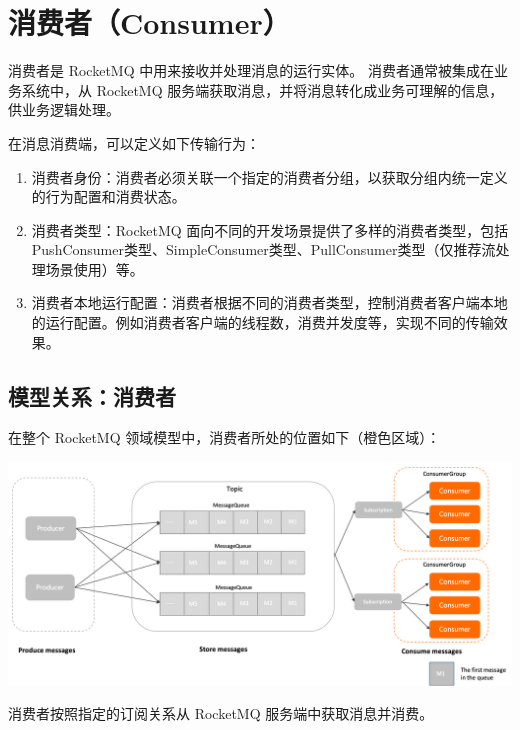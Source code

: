 \documentclass[11pt, a4paper, oneside, fontset=none]{ctexbook}
\begin{document}
\section{消费者（Consumer）}
消费者是 RocketMQ 中用来接收并处理消息的运行实体。
消费者通常被集成在业务系统中，从 RocketMQ 服务端获取消息，并将消息转化成业务可理解的信息，供业务逻辑处理。

在消息消费端，可以定义如下传输行为：
\begin{enumerate}
  \item 消费者身份：消费者必须关联一个指定的消费者分组，以获取分组内统一定义的行为配置和消费状态。
  \item 消费者类型：RocketMQ 面向不同的开发场景提供了多样的消费者类型，包括PushConsumer类型、SimpleConsumer类型、PullConsumer类型（仅推荐流处理场景使用）等。
  \item 消费者本地运行配置：消费者根据不同的消费者类型，控制消费者客户端本地的运行配置。例如消费者客户端的线程数，消费并发度等，实现不同的传输效果。
\end{enumerate}

\subsection{模型关系：消费者}
在整个 RocketMQ 领域模型中，消费者所处的位置如下（橙色区域）：

\begin{center}
  \begin{minipage}{\textwidth}
    \center
    \includegraphics[width=\textwidth]{picture/模型关系：消费者.png}
    \captionsetup{hypcap=false}
    \label{fig:模型关系：消费者}
  \end{minipage}
\end{center}

消费者按照指定的订阅关系从 RocketMQ 服务端中获取消息并消费。
\end{document}
